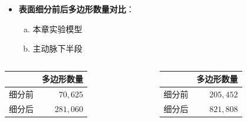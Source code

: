 \begin{frame}
\begin{itemize}
  \item \textbf{表面细分前后多边形数量对比}：
  \begin{enumerate}[(a)]
     \item 本章实验模型
     \item 主动脉下半段
  \end{enumerate}
\end{itemize}
\begin{table}[t]
\renewcommand{\arraystretch}{0.5}
\centering
\begin{columns}[b,onlytextwidth]
\begin{column}{.5\textwidth}
\centering
\begin{tabular*}{35mm}{lr}
\toprule
~              & \small{多边形数量} \\
\midrule
\small{细分前} & \small{$70,625$}     \\
\midrule
\small{细分后} & \small{$281,060$}    \\
\bottomrule
\end{tabular*}
\end{column}
\begin{column}{.5\textwidth}
\centering
\begin{tabular*}{35mm}{lr}
\toprule
~              & \small{多边形数量} \\
\midrule
\small{细分前} & \small{$205,452$}    \\
\midrule
\small{细分后} & \small{$821,808$}    \\
\bottomrule
\end{tabular*}
\end{column}
\end{columns}
\end{table}
\end{frame} 

